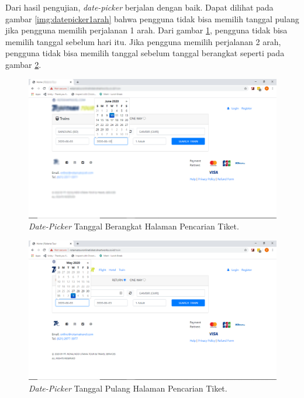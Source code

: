 \begin{enumerate}
        Dari hasil pengujian, \textit{date-picker} berjalan dengan baik. Dapat dilihat pada gambar \ref{img:datepicker1arah} bahwa pengguna tidak bisa memilih tanggal pulang jika pengguna memilih perjalanan 1 arah. Dari gambar \ref{img:datepickerberangkatcari}, pengguna tidak bisa memilih tanggal sebelum hari itu. Jika pengguna memilih perjalanan 2 arah, pengguna tidak bisa memilih tanggal sebelum tanggal berangkat seperti pada gambar \ref{img:datepickerpulangcari}.
        
        \begin{figure}[H]
        \center
        \includegraphics[width=\textwidth,height=\textheight,keepaspectratio]{Gambar/Date-picker tanggal berangkat cari tiket.png}
        \caption{\textit{Date-Picker} Tanggal Berangkat Halaman Pencarian Tiket.}
            \label{img:datepickerberangkatcari}
        \end{figure}
        
        \begin{figure}[H]
        \center
        \includegraphics[width=\textwidth,height=\textheight,keepaspectratio]{Gambar/Date-picker tanggal pulang cari tiket.png}
        \caption{\textit{Date-Picker} Tanggal Pulang Halaman Pencarian Tiket.}
            \label{img:datepickerpulangcari}
        \end{figure}
        

\end{enumerate}
